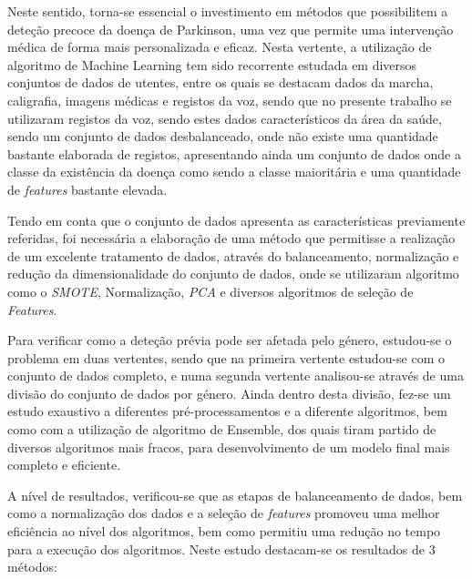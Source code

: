 \documentclass[12pt,a4paper,twoside]{report}
\begin{document}
{Neste sentido, torna-se essencial o investimento em métodos que possibilitem a deteção precoce da doença de Parkinson, uma vez que permite uma intervenção médica de forma mais personalizada e eficaz. Nesta vertente, a utilização de algoritmo de Machine Learning tem sido recorrente estudada em diversos conjuntos de dados de utentes, entre os quais se destacam dados da marcha, caligrafia, imagens médicas e registos da voz, sendo que no presente trabalho se utilizaram registos da voz, sendo estes dados característicos da área da saúde, sendo um conjunto de dados desbalanceado, onde não existe uma quantidade bastante elaborada de registos, apresentando ainda um conjunto de dados onde a classe da existência da doença como sendo a classe maioritária e uma quantidade de \textit{features} bastante elevada.

Tendo em conta que o conjunto de dados apresenta as características previamente referidas, foi necessária a elaboração de uma método que permitisse a realização de um excelente tratamento de dados, através do balanceamento, normalização e redução da dimensionalidade do conjunto de dados, onde se utilizaram algoritmo como o \textit{SMOTE}, Normalização, \textit{PCA} e diversos algoritmos de seleção de \textit{Features}.

Para verificar como a deteção prévia pode ser afetada pelo género, estudou-se o problema em duas vertentes, sendo que na primeira vertente estudou-se com o conjunto de dados completo, e numa segunda vertente analisou-se através de uma divisão do conjunto de dados por género. Ainda dentro desta divisão, fez-se um estudo exaustivo a diferentes pré-processamentos e a diferente algoritmos, bem como com a utilização de algoritmo de Ensemble, dos quais tiram partido de diversos algoritmos mais fracos, para desenvolvimento de um modelo final mais completo e eficiente.

A nível de resultados, verificou-se que as etapas de balanceamento de dados, bem como a normalização dos dados e a seleção de \textit{features} promoveu uma melhor eficiência ao nível dos algoritmos, bem como permitiu uma redução no tempo para a execução dos algoritmos. Neste estudo destacam-se os resultados de 3 métodos:

}
\end{document}
